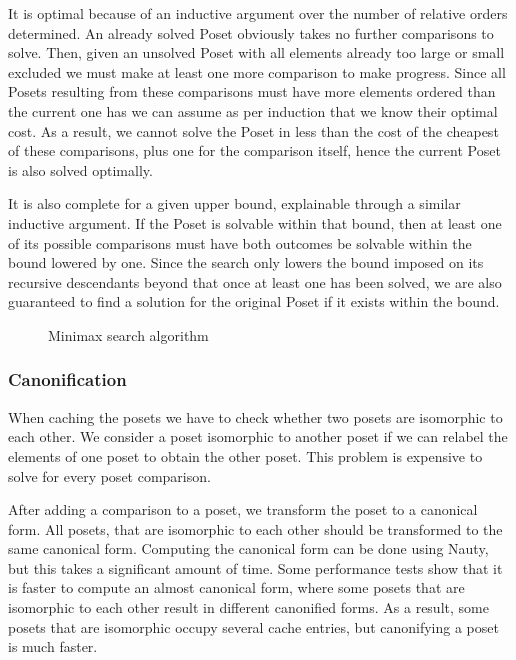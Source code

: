 \documentclass[10pt,journal,compsoc]{IEEEtran}
\begin{document}
It is optimal because of an inductive argument over the number of relative orders determined. An
already solved Poset obviously takes no further comparisons to solve. Then, given an unsolved Poset
with all elements already too large or small excluded we must make at least one more comparison to
make progress. Since all Posets resulting from these comparisons must have more elements ordered
than the current one has we can assume as per induction that we know their optimal cost. As a result, we
cannot solve the Poset in less than the cost of the cheapest of these comparisons, plus one for the
comparison itself, hence the current Poset is also solved optimally.

It is also complete for a given upper bound, explainable through a similar inductive argument. If
the Poset is solvable within that bound, then at least one of its possible comparisons must have both
outcomes be solvable within the bound lowered by one. Since the search only lowers the bound imposed
on its recursive descendants beyond that once at least one has been solved, we are also guaranteed
to find a solution for the original Poset if it exists within the bound.

\begin{figure}
  
  \caption{Minimax search algorithm}
  \label{fig:minimax_search}
\end{figure}

\subsubsection{Canonification}

When caching the posets we have to check whether two posets are isomorphic to each other.
We consider a poset isomorphic to another poset if we can relabel the elements of one poset to obtain the other poset.
This problem is expensive to solve for every poset comparison.

After adding a comparison to a poset, we transform the poset to a canonical form.
All posets, that are isomorphic to each other should be transformed to the same canonical form.
Computing the canonical form can be done using Nauty, but this takes a significant amount of time.
Some performance tests show that it is faster to compute an almost canonical form, where some posets that are isomorphic to each other result in different canonified forms.
As a result, some posets that are isomorphic occupy several cache entries, but canonifying a poset is much faster.
\end{document}
